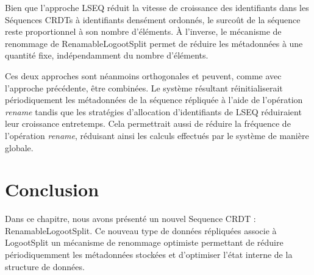 \documentclass[12pt]{thesul}
\begin{document}
Bien que l'approche LSEQ réduit la vitesse de croissance des identifiants dans les Séquences \acp{CRDT} à identifiants densément ordonnés, le surcoût de la séquence reste proportionnel à son nombre d'éléments.
À l'inverse, le mécanisme de renommage de RenamableLogootSplit permet de réduire les métadonnées à une quantité fixe, indépendamment du nombre d'éléments.

Ces deux approches sont néanmoins orthogonales et peuvent, comme avec l'approche précédente, être combinées.
Le système résultant réinitialiserait périodiquement les métadonnées de la séquence répliquée à l'aide de l'opération \emph{rename} tandis que les stratégies d'allocation d'identifiants de LSEQ réduiraient leur croissance entretemps.
Cela permettrait aussi de réduire la fréquence de l'opération \emph{rename}, réduisant ainsi les calculs effectués par le système de manière globale.





\section{Conclusion}

Dans ce chapitre, nous avons présenté un nouvel Sequence \ac{CRDT} : RenamableLogootSplit.
Ce nouveau type de données répliquées associe à LogootSplit un mécanisme de renommage optimiste permettant de réduire périodiquemment les métadonnées stockées et d'optimiser l'état interne de la structure de données.
\end{document}
